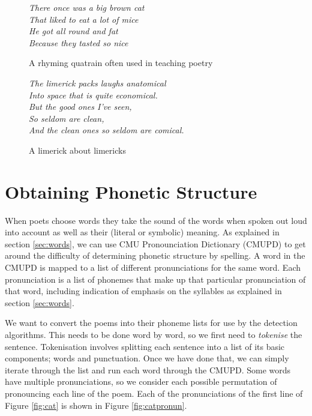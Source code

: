 \begin{figure}
\centering
\begin{minipage}{0.45\textwidth}
\centering
\textit{
There once was a big brown cat\\
That liked to eat a lot of mice\\
He got all round and fat\\
Because they tasted so nice
}
\caption{A rhyming quatrain often used in teaching poetry}
\label{fig:cat}
\end{minipage}\hfill
\begin{minipage}{0.45\textwidth}
\centering
\textit{
The limerick packs laughs anatomical\\
Into space that is quite economical.\\
    But the good ones I've seen,\\
    So seldom are clean,\\
And the clean ones so seldom are comical.
}
\caption{A limerick about limericks}
\label{fig:limerick}
\end{minipage}
\end{figure}


\section{Obtaining Phonetic Structure}

When poets choose words they take the sound of the words when spoken out loud into account as well as their (literal or symbolic) meaning. As explained in section \ref{sec:words}, we can use CMU Pronounciation Dictionary (CMUPD) to get around the difficulty of determining phonetic structure by spelling. A word in the CMUPD is mapped to a list of different pronunciations for the same word. Each pronunciation is a list of phonemes that make up that particular pronunciation of that word, including indication of emphasis on the syllables as explained in section \ref{sec:words}.

We want to convert the poems into their phoneme lists for use by the detection algorithms. This needs to be done word by word, so we first need to \textit{tokenise} the sentence. Tokenisation involves splitting each sentence into a list of its basic components; words and punctuation. Once we have done that, we can simply iterate through the list and run each word through the CMUPD. Some words have multiple pronunciations, so we consider each possible permutation of pronouncing each line of the poem. Each of the pronunciations of the first line of Figure \ref{fig:cat} is shown in Figure \ref{fig:catpronun}.

